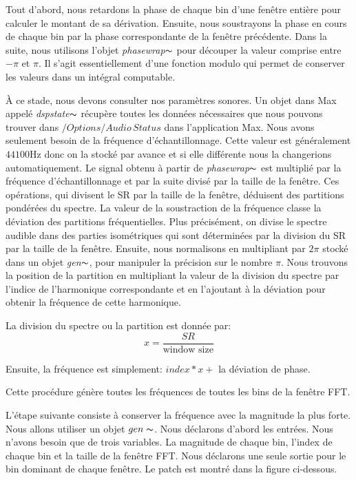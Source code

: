 Tout d'abord, nous retardons la phase de chaque bin d'une fenêtre entière pour calculer le montant de sa dérivation. Ensuite, nous soustrayons la phase en cours de chaque bin par la phase correspondante de la fenêtre précédente. Dans la suite, nous utilisons l’objet \textit{phasewrap}$ \thicksim $ pour découper la valeur comprise entre $ - \pi $ et $ \pi $. Il s'agit essentiellement d'une fonction modulo qui permet de conserver les valeurs dans un intégral computable.

À ce stade, nous devons consulter nos paramètres sonores. Un objet dans Max appelé \textit{dspstate}$ \thicksim $ récupère toutes les données nécessaires que nous pouvons trouver dans $ / Options / Audio \, Status $ dans l'application Max. Nous avons seulement besoin de la fréquence d'échantillonnage. Cette valeur est généralement $ 44100 $Hz donc on la stocké par avance et si elle différente nous la changerions automatiquement. Le signal obtenu à partir de \textit{phasewrap}$ \thicksim $ est multiplié par la fréquence d'échantillonnage et par la suite divisé par la taille de la fenêtre. Ces opérations, qui divisent le SR par la taille de la fenêtre, déduisent des partitions pondérées du spectre. La valeur de la soustraction de la fréquence classe la déviation des partitions fréquentielles. Plus précisément, on divise le spectre audible dans des parties isométriques qui sont déterminées par la division du SR par la taille de la fenêtre. Ensuite, nous normalisons en multipliant par $ 2 \pi $ stocké dans un objet \textit{gen}$\thicksim $, pour manipuler la précision sur le nombre $\pi$. Nous trouvons la position de la partition en multipliant la valeur de la division du spectre par l'indice de l’harmonique correspondante et en l'ajoutant à la déviation pour obtenir la fréquence de cette harmonique.

La division du spectre ou la partition est donnée par:
    \begin{equation*}
        x = \frac{SR}{\text{window size}}
    \end{equation*}

Ensuite, la fréquence est simplement: $ index * x + $ la déviation de phase.

Cette procédure génère toutes les fréquences de toutes les bins de la fenêtre FFT.

L'étape suivante consiste à conserver la fréquence avec la magnitude la plus forte. Nous allons utiliser un objet $ gen \thicksim $. Nous déclarons d'abord les entrées. Nous n'avons besoin que de trois variables. La magnitude de chaque bin, l’index de chaque bin et la taille de la fenêtre FFT. Nous déclarons une seule sortie pour le bin dominant de chaque fenêtre. Le patch est montré dans la figure ci-dessous.
        
